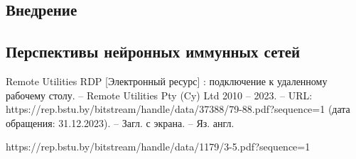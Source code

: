 \documentclass[bachelor, och, referat]{template}
\begin{document}
\subsection{Внедрение }
\subsection{}


\subsection{Перспективы нейронных иммунных сетей}


\begin{thebibliography}{15}
    Remote Utilities RDP [Электронный ресурс] : подключение к удаленному рабочему столу. --  
    Remote Utilities Pty (Cy) Ltd 2010 -- 2023. -- URL:  https://rep.bstu.by/bitstream/handle/data/37388/79-88.pdf?sequence=1 (дата обращения: 31.12.2023). -- Загл. с экрана. -- Яз. англ.
    
    https://rep.bstu.by/bitstream/handle/data/1179/3-5.pdf?sequence=1
\end{thebibliography}
\end{document}
